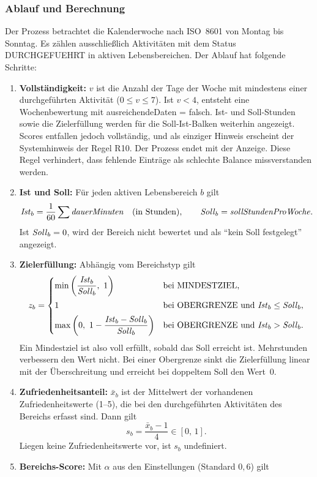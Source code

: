\subsubsection{Ablauf und Berechnung}
Der Prozess betrachtet die Kalenderwoche nach \ac{ISO}~8601 von Montag bis Sonntag. Es zählen ausschließlich Aktivitäten mit dem Status DURCHGEFUEHRT in aktiven Lebensbereichen. Der Ablauf hat folgende Schritte:
\begin{enumerate}
  \item \textbf{Vollständigkeit:} $v$ ist die Anzahl der Tage der Woche mit mindestens einer durchgeführten Aktivität ($0 \leq v \leq 7$). Ist $v < 4$, entsteht eine Wochenbewertung mit ausreichendeDaten = falsch. Ist- und Soll-Stunden sowie die Zielerfüllung werden für die Soll-Ist-Balken weiterhin angezeigt. Scores entfallen jedoch vollständig, und als einziger Hinweis erscheint der Systemhinweis der Regel R10. Der Prozess endet mit der Anzeige. Diese Regel verhindert, dass fehlende Einträge als schlechte Balance missverstanden werden.
  \item \textbf{Ist und Soll:} Für jeden aktiven Lebensbereich $b$ gilt
  \[ \mathit{Ist}_b = \frac{1}{60} \sum \mathit{dauerMinuten} \quad \text{(in Stunden)}, \qquad \mathit{Soll}_b = \mathit{sollStundenProWoche}. \]
  Ist $\mathit{Soll}_b = 0$, wird der Bereich nicht bewertet und als \enquote{kein Soll festgelegt} angezeigt.
  \item \textbf{Zielerfüllung:} Abhängig vom Bereichstyp gilt
  \[ z_b = \begin{cases}
      \min\left(\dfrac{\mathit{Ist}_b}{\mathit{Soll}_b},\ 1\right) & \text{bei MINDESTZIEL,}\\[2ex]
      1 & \text{bei OBERGRENZE und } \mathit{Ist}_b \leq \mathit{Soll}_b,\\[1ex]
      \max\left(0,\ 1 - \dfrac{\mathit{Ist}_b - \mathit{Soll}_b}{\mathit{Soll}_b}\right) & \text{bei OBERGRENZE und } \mathit{Ist}_b > \mathit{Soll}_b.
    \end{cases} \]
  Ein Mindestziel ist also voll erfüllt, sobald das Soll erreicht ist. Mehrstunden verbessern den Wert nicht. Bei einer Obergrenze sinkt die Zielerfüllung linear mit der Überschreitung und erreicht bei doppeltem Soll den Wert~0.
  \item \textbf{Zufriedenheitsanteil:} $\bar{x}_b$ ist der Mittelwert der vorhandenen Zufriedenheitswerte (1--5), die bei den durchgeführten Aktivitäten des Bereichs erfasst sind. Dann gilt
  \[ s_b = \frac{\bar{x}_b - 1}{4} \in [0,\,1]. \]
  Liegen keine Zufriedenheitswerte vor, ist $s_b$ undefiniert.
  \item \textbf{Bereichs-Score:} Mit $\alpha$ aus den Einstellungen (Standard $0{,}6$) gilt

\end{enumerate}
